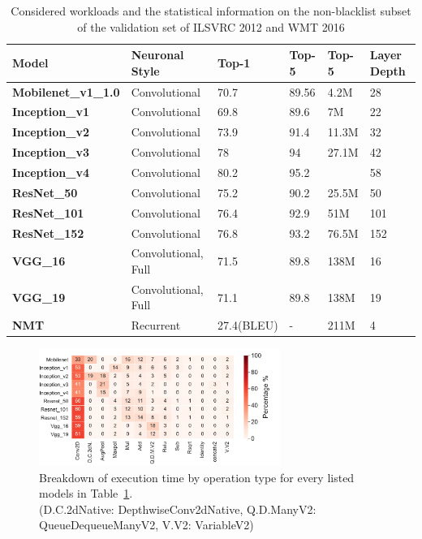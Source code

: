 \begin{table}[t!]
\begin{center}
\vspace{-1mm}
\caption{Considered workloads and the statistical information
 on the non-blacklist subset of the validation set of ILSVRC 2012 and WMT 2016}
\vspace{-2mm}
\scriptsize
\label{tbl:workload}
\begin{tabular}{llllll}
\toprule
\textbf{Model}&\textbf{Neuronal Style}& \textbf{Top-1} & \textbf{Top-5}& \textbf{Top-5}& \textbf{Layer Depth} \\
\midrule
\textbf{Mobilenet\_v1\_1.0} & Convolutional & 70.7 & 89.56 &	4.2M	&28 \\
\textbf{Inception\_v1}     &Convolutional & 69.8  & 89.6	&7M&	22  \\
\textbf{Inception\_v2}     &Convolutional &73.9	&91.4 & 11.3M& 	32 \\
\textbf{Inception\_v3}     &Convolutional  & 78	&94 &	27.1M	&42 \\
\textbf{Inception\_v4}     &Convolutional& 80.2	&95.2 & &58 \\
\textbf{ResNet\_50}        &Convolutional & 75.2&	90.2&	25.5M &	50\\
\textbf{ResNet\_101} &Convolutional &76.4	&92.9&	51M&	101  \\
\textbf{ResNet\_152} &Convolutional & 76.8	&93.2&	76.5M	&152\\
\textbf{VGG\_16} &Convolutional, Full & 71.5&	89.8	&138M	&16 \\
\textbf{VGG\_19} &Convolutional, Full & 71.1	&89.8	&138M	&19  \\
\textbf{NMT} &Recurrent  & 27.4(BLEU)	& -	&211M	&4 \\
\bottomrule
\end{tabular}
\end{center}
\vspace{-6mm}
\end{table}


\begin{figure}[!t]
\centering
\includegraphics[width=0.7\textwidth]{figure/break11models.pdf}
\caption{ Breakdown of execution time by operation type for every listed models in Table~\ref{tbl:workload}.\\
(D.C.2dNative: DepthwiseConv2dNative, Q.D.ManyV2: QueueDequeueManyV2, V.V2: VariableV2)}
 \label{fig:breakdown11}

\end{figure}



